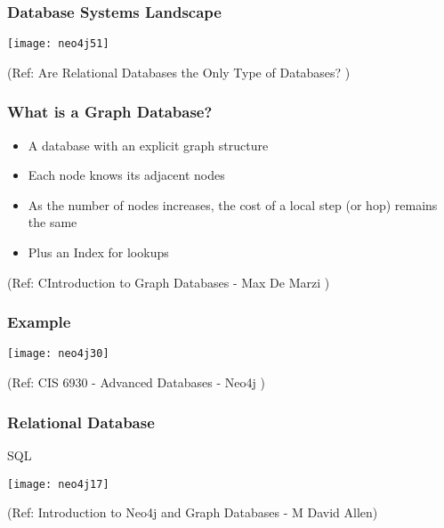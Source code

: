 \begin{frame}\frametitle{Database Systems Landscape }


\begin{center}
\texttt{[image: neo4j51]}
\end{center}	

{\tiny (Ref: Are Relational Databases the Only Type of Databases? )}

\end{frame}


\begin{frame}\frametitle{What is a Graph Database?}

\begin{itemize}
\item A database with an explicit graph structure
\item Each node knows its adjacent nodes 
\item As the number of nodes increases, the cost of a local step (or hop) remains the same
\item Plus an Index for lookups
\end{itemize}

{\tiny (Ref: CIntroduction to Graph Databases - Max De Marzi )}
\end{frame}


\begin{frame}\frametitle{Example}


\begin{center}
\texttt{[image: neo4j30]}
\end{center}	

{\tiny (Ref: CIS 6930 - Advanced Databases - Neo4j )}
\end{frame}

\begin{frame}[fragile]\frametitle{Relational Database}
SQL

\begin{center}
\texttt{[image: neo4j17]}
\end{center}	    

{\tiny (Ref: Introduction to Neo4j and Graph Databases
 - M David Allen)}

\end{frame}

